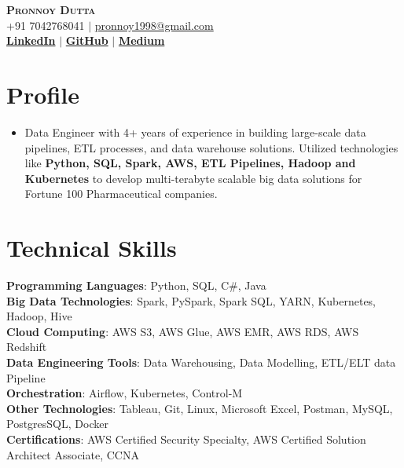 \documentclass[letterpaper,11pt]{article}
\begin{document}
\begin{center}
    \textbf{\Huge \scshape Pronnoy Dutta} \\ \vspace{1pt}
    \small +91 7042768041 $|$ \href{mailto:pronnoy1998@gmail.com}{{pronnoy1998@gmail.com}}    \\ 
    \small  
    \href{https://www.linkedin.com/in/pronnoy-dutta/}{\bf LinkedIn} $|$
    \href{https://github.com/pronns}{\bf GitHub} $|$
    \href{https://medium.com/@pronnoy1998}{\bf Medium}
    
\end{center}

\section{Profile}
\begin{itemize}[leftmargin=0.05in, label={}]
\item 
Data Engineer with 4+ years of experience in building large-scale data pipelines, ETL processes, and data warehouse solutions. Utilized technologies like \textbf{Python, SQL, Spark, AWS, ETL Pipelines,  Hadoop and Kubernetes} to develop multi-terabyte scalable big data solutions for Fortune 100 Pharmaceutical companies.
\end{itemize}

\section{Technical Skills}
 \begin{itemize}[leftmargin=0.15in, label={}]
    \small{\item{
     \textbf{Programming Languages}{:\hspace{0.06cm}  Python, SQL, C\#, Java} \\
     \textbf{Big Data Technologies}{:\hspace{0.49cm}     Spark, PySpark, Spark SQL, YARN, Kubernetes, Hadoop, Hive } \\
     \textbf{Cloud Computing}{: \hspace{1.10cm} AWS S3, AWS Glue, AWS EMR, AWS RDS, AWS Redshift } \\
     \textbf{Data Engineering Tools}{:\hspace{0.28cm} Data Warehousing, Data Modelling, ETL/ELT data Pipeline}\\
     \textbf{Orchestration}{:\hspace{2.02cm} Airflow, Kubernetes, Control-M} \\
     \textbf{Other Technologies}{:\hspace{1.02cm} Tableau, Git, Linux, Microsoft Excel, Postman, MySQL, PostgresSQL, Docker} \\
     \textbf{Certifications}{:\hspace{2.04cm} AWS Certified Security Specialty, AWS Certified Solution Architect Associate, CCNA} \\
     
     
    }}
 \end{itemize}
\end{document}
